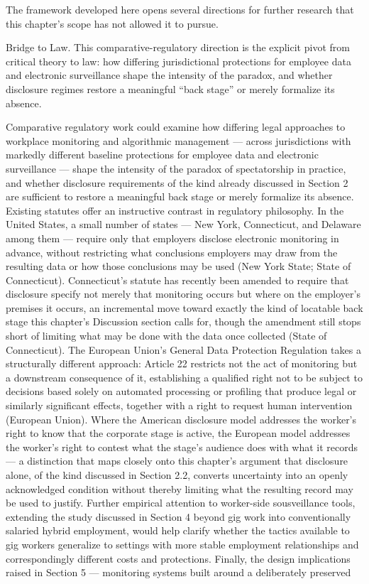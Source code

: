 \documentclass[12pt]{article}
\begin{document}
The framework developed here opens several directions for further research that this chapter's scope has not allowed it to pursue.

\begin{callout}{Bridge to Law.}
This comparative-regulatory direction is the explicit pivot from critical theory to law: how differing jurisdictional protections for employee data and electronic surveillance shape the intensity of the paradox, and whether disclosure regimes restore a meaningful ``back stage'' or merely formalize its absence.
\end{callout}

Comparative regulatory work could examine how differing legal approaches to workplace monitoring and algorithmic management --- across jurisdictions with markedly different baseline protections for employee data and electronic surveillance --- shape the intensity of the paradox of spectatorship in practice, and whether disclosure requirements of the kind already discussed in Section 2 are sufficient to restore a meaningful back stage or merely formalize its absence. Existing statutes offer an instructive contrast in regulatory philosophy. In the United States, a small number of states --- New York, Connecticut, and Delaware among them --- require only that employers disclose electronic monitoring in advance, without restricting what conclusions employers may draw from the resulting data or how those conclusions may be used (New York State; State of Connecticut). Connecticut's statute has recently been amended to require that disclosure specify not merely that monitoring occurs but where on the employer's premises it occurs, an incremental move toward exactly the kind of locatable back stage this chapter's Discussion section calls for, though the amendment still stops short of limiting what may be done with the data once collected (State of Connecticut). The European Union's General Data Protection Regulation takes a structurally different approach: Article 22 restricts not the act of monitoring but a downstream consequence of it, establishing a qualified right not to be subject to decisions based solely on automated processing or profiling that produce legal or similarly significant effects, together with a right to request human intervention (European Union). Where the American disclosure model addresses the worker's right to know that the corporate stage is active, the European model addresses the worker's right to contest what the stage's audience does with what it records --- a distinction that maps closely onto this chapter's argument that disclosure alone, of the kind discussed in Section 2.2, converts uncertainty into an openly acknowledged condition without thereby limiting what the resulting record may be used to justify. Further empirical attention to worker-side sousveillance tools, extending the study discussed in Section 4 beyond gig work into conventionally salaried hybrid employment, would help clarify whether the tactics available to gig workers generalize to settings with more stable employment relationships and correspondingly different costs and protections. Finally, the design implications raised in Section 5 --- monitoring systems built around a deliberately preserved 
\end{document}
